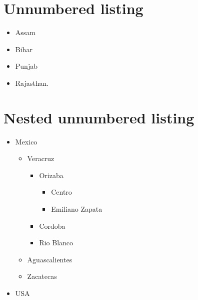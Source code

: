 \documentclass{article}
\begin{document}
\section{Unnumbered listing}

    \begin{itemize}
        \item Assam
        \item Bihar
        \item Punjab
        \item Rajasthan.
    \end{itemize}

\section{Nested unnumbered listing}
    \begin{itemize}
        \item Mexico
        \begin{itemize}
            \item Veracruz
            \begin{itemize}
                \item Orizaba
                    \begin{itemize}
                        \item Centro
                        \item Emiliano Zapata
                    \end{itemize}
                \item Cordoba
                \item Rio Blanco
            \end{itemize}
        \item Aguascalientes
        \item Zacatecas
        \end{itemize}
    \item USA
    \end{itemize}  
\end{document}
